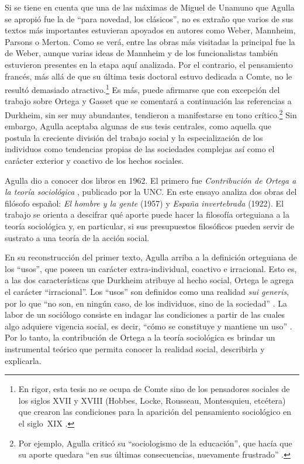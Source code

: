 Si se tiene en cuenta que una de las máximas de Miguel de Unamuno que Agulla se apropió fue la de \enquote{para novedad, los clásicos}, no es extraño que varios de sus textos más importantes estuvieran apoyados en autores como Weber, Mannheim, Parsons o Merton. Como se verá, entre las obras más visitadas la principal fue la de Weber, aunque varias ideas de Mannheim y de los funcionalistas también estuvieron presentes en la etapa aquí analizada. Por el contrario, el pensamiento francés, más allá de que su última tesis doctoral estuvo dedicada a Comte, no le resultó demasiado atractivo.\footnote{En rigor, esta tesis no se ocupa de Comte sino de los pensadores sociales de los siglos XVII y XVIII (Hobbes, Locke, Rousseau, Montesquieu, etcétera) que crearon las condiciones para la aparición del pensamiento sociológico en el siglo~XIX \parencite{1637-AGULLA1962}.} Es más, puede afirmarse que con excepción del trabajo sobre Ortega y Gasset que se comentará a continuación las referencias a Durkheim, sin ser muy abundantes, tendieron a manifestarse en tono crítico.\footnote{Por ejemplo, Agulla criticó su \enquote{sociologismo de la educación}, que hacía que su aporte quedara \enquote{en sus últimas consecuencias, nuevamente frustrado} \parencite[60]{1638-AGULLA1964}.} Sin embargo, Agulla aceptaba algunas de sus tesis centrales, como aquella que postula la creciente división del trabajo social y la especialización de los individuos como tendencias propias de las sociedades complejas así como el carácter exterior y coactivo de los hechos sociales.

Agulla dio a conocer dos libros en 1962. El primero fue \emph{Contribución de Ortega a la teoría sociológica} \parencite{1639-AGULLA1962}, publicado por la UNC. En este ensayo analiza dos obras del filósofo español: \emph{El hombre y la gente} (1957) y \emph{España invertebrada} (1922). El trabajo se orienta a descifrar qué aporte puede hacer la filosofía orteguiana a la teoría sociológica y, en particular, si sus presupuestos filosóficos pueden servir de sustrato a una teoría de la acción social.

En su reconstrucción del primer texto, Agulla arriba a la definición orteguiana de los \enquote{usos}, que poseen un carácter extra-individual, coactivo e irracional. Esto es, a las dos características que Durkheim atribuye al hecho social, Ortega le agrega el carácter \enquote{irracional}. Los \enquote{usos} son definidos como una realidad \emph{sui generis}, por lo que \enquote{no son, en ningún caso, de los individuos, sino de la sociedad} \parencite[34]{1639-AGULLA1962}. La labor de un sociólogo consiste en indagar las condiciones a partir de las cuales algo adquiere vigencia social, es decir, \enquote{cómo se constituye y mantiene un uso} \parencite[42]{1639-AGULLA1962}. Por lo tanto, la contribución de Ortega a la teoría sociológica es brindar un instrumental teórico que permita conocer la realidad social, describirla y explicarla.

